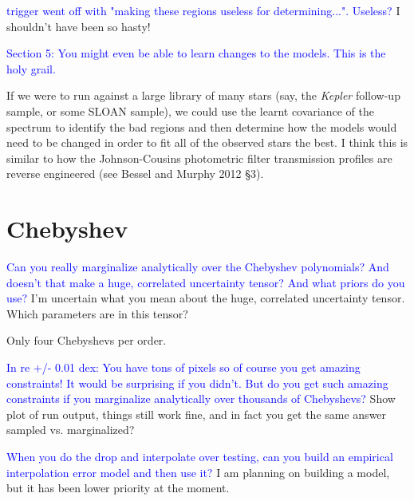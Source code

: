 \documentclass[preprint]{aastex} %
\newcommand{\hcom}[1]{ \textcolor{Blue}{#1}}
\begin{document}
\hcom{trigger went off with "making these regions useless for determining...". Useless?}
I shouldn't have been so hasty!

\hcom{Section 5: You might even be able to learn changes to the models. This is the holy grail.}

If we were to run against a large library of many stars (say, the \emph{Kepler} follow-up sample, or some SLOAN sample), we could use the learnt covariance of the spectrum to identify the bad regions and then determine how the models would need to be changed in order to fit all of the observed stars the best. I think this is similar to how the Johnson-Cousins photometric filter transmission profiles are reverse engineered (see Bessel and Murphy 2012 \S 3).


\section{Chebyshev}
\hcom{Can you really marginalize analytically over the Chebyshev polynomials? And doesn't that make a huge, correlated uncertainty tensor? And what priors do you use?}
I'm uncertain what you mean about the huge, correlated uncertainty tensor. Which parameters are in this tensor? 

Only four Chebyshevs per order.

\hcom{In re +/- 0.01 dex: You have tons of pixels so of course you get amazing constraints! It would be surprising if you didn't. But do you get such amazing constraints if you marginalize analytically over thousands of Chebyshevs?}
Show plot of run output, things still work fine, and in fact you get the same answer sampled vs. marginalized?

\hcom{When you do the drop and interpolate over testing, can you build an empirical interpolation error model and then use it?}
I am planning on building a model, but it has been lower priority at the moment. 








\end{document}
